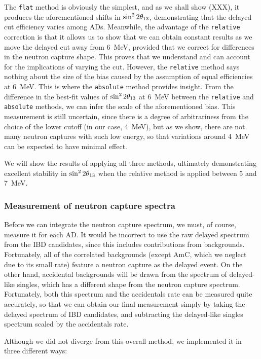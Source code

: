 \documentclass[../thesis.tex]{subfiles}
\begin{document}
The \texttt{flat} method is obviously the simplest, and as we shall show (XXX), it produces the aforementioned shifts in $\sin^2 2\theta_{13}$, demonstrating that the delayed cut efficiency varies among ADs. Meanwhile, the advantage of the \texttt{relative} correction is that it allows us to show that we can obtain constant results as we move the delayed cut away from 6~MeV, provided that we correct for differences in the neutron capture shape. This proves that we understand and can account for the implications of varying the cut. However, the \texttt{relative} method says nothing about the size of the bias caused by the assumption of equal efficiencies at 6~MeV. This is where the \texttt{absolute} method provides insight. From the difference in the best-fit values of $\sin^2 2\theta_{13}$ at 6~MeV between the \texttt{relative} and \texttt{absolute} methods, we can infer the scale of the aforementioned bias. This measurement is still uncertain, since there is a degree of arbitrariness from the choice of the lower cutoff (in our case, 4~MeV), but as we show, there are not many neutron captures with such low energy, so that variations around 4~MeV can be expected to have minimal effect.

We will show the results of applying all three methods, ultimately demonstrating excellent stability in $\sin^2 2\theta_{13}$ when the relative method is applied between 5 and 7~MeV.

\subsubsection{Measurement of neutron capture spectra}
\label{sec:cutVaryDelCutSpecMeas}

Before we can integrate the neutron capture spectrum, we must, of course, measure it for each AD. It would be incorrect to use the raw delayed spectrum from the IBD candidates, since this includes contributions from backgrounds. Fortunately, all of the correlated backgrounds (except AmC, which we neglect due to its small rate) feature a neutron capture as the delayed event. On the other hand, accidental backgrounds will be drawn from the spectrum of delayed-like singles, which has a different shape from the neutron capture spectrum. Fortunately, both this spectrum and the accidentals rate can be measured quite accurately, so that we can obtain our final measurement simply by taking the delayed spectrum of IBD candidates, and subtracting the delayed-like singles spectrum scaled by the accidentals rate.

Although we did not diverge from this overall method, we implemented it in three different ways:
\end{document}
